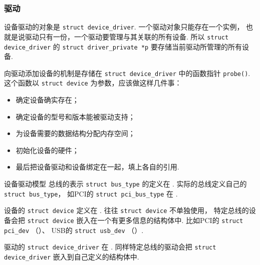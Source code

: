 \subsubsection{驱动}
设备驱动的对象是 \lstinline{struct device_driver}.
一个驱动对象只能存在一个实例，
也就是说驱动只有一份，一个驱动要管理与其关联的所有设备.
所以 \lstinline{struct device_driver} 的 \lstinline{struct driver_private *p}
要存储当前驱动所管理的所有设备.

向驱动添加设备的机制是存储在 \lstinline{struct device_driver} 中的函数指针
\lstinline{probe()}.
这个函数以 \lstinline{struct device} 为参数，应该做这样几件事\cite{devicedriver}：
\begin{itemize}
	\item 确定设备确实存在；
	\item 确定设备的型号和版本能被驱动支持；
	\item 为设备需要的数据结构分配内存空间；
	\item 初始化设备的硬件；
	\item 最后把设备驱动和设备绑定在一起，填上各自的引用.
\end{itemize}
\begin{readsrcbox}{设备驱动模型}
	总线的表示 \lstinline{struct bus_type}
	的定义在 .
	实际的总线定义自己的 \lstinline{struct bus_type}，
	如PCI的 \lstinline{struct pci_bus_type} 在 .

	设备的 \lstinline{struct device}
	定义在 .
	往往 \lstinline{struct device} 不单独使用，
	特定总线的设备会把 \lstinline{struct device} 嵌入在一个有更多信息的结构体中.
	比如PCI的 \lstinline{struct pci_dev} （）、
	USB的 \lstinline{struct usb_dev} （）.

	驱动的 \lstinline{struct device_driver} 
	在 .
	同样特定总线的驱动会把 \lstinline{struct device_driver} 嵌入到自己定义的结构体中.
\end{readsrcbox}


